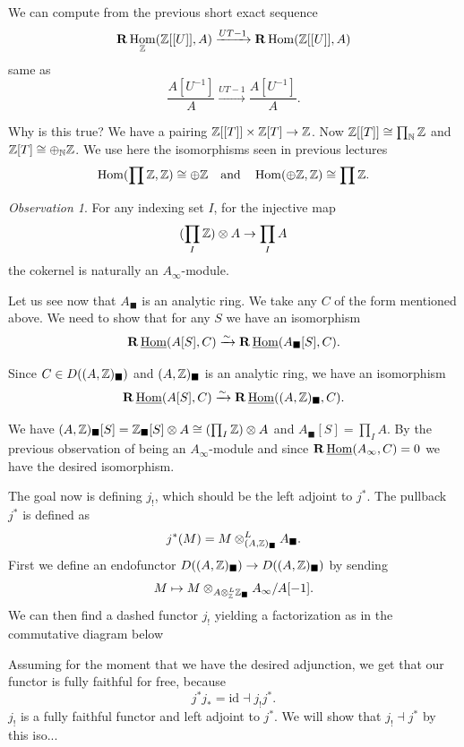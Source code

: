\documentclass[A4paper, british, reqno]{amsart}
\theoremstyle{darkgreentheorem}
\theoremstyle{darkbluedefinition}
\theoremstyle{darkredexample}
\theoremstyle{remark}
\newtheorem{obs}[thm]{Observation}
\DeclareMathOperator{\Hom}{Hom}
\DeclareMathOperator{\ihom}{\underline{Hom}}
\newcommand{\1}{\mathbbm{1}}
\newcommand{\ot}{\otimes}
\newcommand{\op}{\oplus}
\newcommand{\id}{\mathrm{id}}
\newcommand{\usolid}{_{\blacksquare}}
\begin{document}
We can compute from the previous short exact sequence
\[ \bfR\Hom_{\Z}(\Z[[U]],A)\xrightarrow{UT-1}\bfR\Hom(\Z[[U]],A) \]
same as
\[ \frac{A[U^{-1}]}{A}\xrightarrow{UT-1} \frac{A[U^{-1}]}{A}. \]

Why is this true?
We have a pairing $\mathbb{Z}[[T]]\times \mathbb{Z}[T]\to \mathbb{Z}$.
Now $\mathbb{Z}[[T]]\cong \prod_{\mathbb{N}}\mathbb{Z}$ and $\Z[T]\cong \op_{\N} \Z$.
We use here the isomorphisms seen in previous lectures
\[ \Hom(\prod \Z,\Z)\cong \op \Z \quad \text{and}\quad \Hom(\op \Z,\Z)\cong \prod \Z. \]

\begin{obs}
    For any indexing set $I$, for the injective map
    \[ (\prod_{I}\Z)\ot A\to \prod_{I}A \]
    the cokernel is naturally an $A_{\infty}$-module.
\end{obs}

Let us see now that $A\usolid$ is an analytic ring.
We take any $C$ of the form mentioned above.
We need to show that for any $S$ we have an isomorphism
\[ \bfR\ihom(A[S],C)\xrightarrow{\sim}\bfR\ihom(A\usolid[S],C).\]

Since $C\in D((A,\Z)\usolid)$ and $(A,\Z)\usolid$ is an analytic ring, we have an isomorphism
\[ \bfR\ihom(A[S],C)\xrightarrow{\sim} \bfR\ihom((A,\Z)\usolid,C). \]

We have $(A,\Z)\usolid[S]=\Z\usolid[S]\ot A\cong (\prod_{I}\Z)\ot A$ and $A\usolid[S]=\prod_{I}A$.
By the previous observation of being an $A_{\infty}$-module and since $\bfR\ihom(A_{\infty},C)=0$ we have the desired isomorphism.

The goal now is defining $j_{!}$, which should be the left adjoint to $j^{*}$.
The pullback $j^{*}$ is defined as
\[ j^{*}(M)=M\ot_{(A,\Z)\usolid}^{L} A\usolid. \]
First we define an endofunctor $D((A,\Z)\usolid)\to D((A,\Z)\usolid)$ by sending
\[ M\mapsto M\ot_{A\ot_{\Z}^{L}\Z\usolid}A_{\infty}/A [-1]. \] 
We can then find a dashed functor $j_{!}$ yielding a factorization as in the commutative diagram below
\begin{center}
\end{center}

Assuming for the moment that we have the desired adjunction, we get that our functor is fully faithful for free, because
\[ j^{*}j_{*}=\id \dashv j_{!}j^{*}. \]
$j_{!}$ is a fully faithful functor and left adjoint to $j^{*}$.
We will show that $j_{!}\dashv j^{*}$ by this iso...
\end{document}
